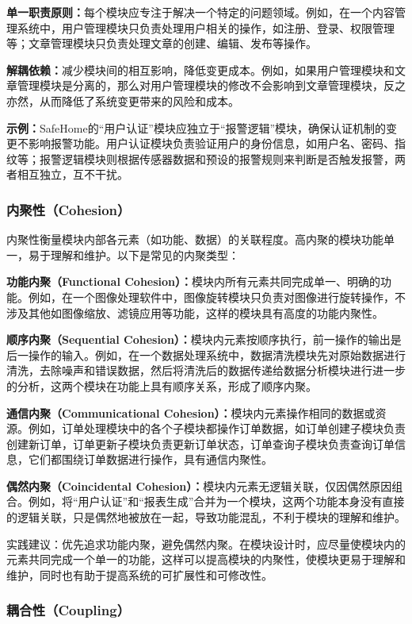 \textbf{单一职责原则：}每个模块应专注于解决一个特定的问题领域。例如，在一个内容管理系统中，用户管理模块只负责处理用户相关的操作，如注册、登录、权限管理等；文章管理模块只负责处理文章的创建、编辑、发布等操作。

\textbf{解耦依赖：}减少模块间的相互影响，降低变更成本。例如，如果用户管理模块和文章管理模块是分离的，那么对用户管理模块的修改不会影响到文章管理模块，反之亦然，从而降低了系统变更带来的风险和成本。

\textbf{示例：}SafeHome的``用户认证''模块应独立于``报警逻辑''模块，确保认证机制的变更不影响报警功能。用户认证模块负责验证用户的身份信息，如用户名、密码、指纹等；报警逻辑模块则根据传感器数据和预设的报警规则来判断是否触发报警，两者相互独立，互不干扰。

\subsubsection{内聚性（Cohesion）}

内聚性衡量模块内部各元素（如功能、数据）的关联程度。高内聚的模块功能单一，易于理解和维护。以下是常见的内聚类型：

\textbf{功能内聚（Functional Cohesion）：}模块内所有元素共同完成单一、明确的功能。例如，在一个图像处理软件中，图像旋转模块只负责对图像进行旋转操作，不涉及其他如图像缩放、滤镜应用等功能，这样的模块具有高度的功能内聚性。

\textbf{顺序内聚（Sequential Cohesion）：}模块内元素按顺序执行，前一操作的输出是后一操作的输入。例如，在一个数据处理系统中，数据清洗模块先对原始数据进行清洗，去除噪声和错误数据，然后将清洗后的数据传递给数据分析模块进行进一步的分析，这两个模块在功能上具有顺序关系，形成了顺序内聚。

\textbf{通信内聚（Communicational Cohesion）：}模块内元素操作相同的数据或资源。例如，订单处理模块中的各个子模块都操作订单数据，如订单创建子模块负责创建新订单，订单更新子模块负责更新订单状态，订单查询子模块负责查询订单信息，它们都围绕订单数据进行操作，具有通信内聚性。

\textbf{偶然内聚（Coincidental Cohesion）：}模块内元素无逻辑关联，仅因偶然原因组合。例如，将``用户认证''和``报表生成''合并为一个模块，这两个功能本身没有直接的逻辑关联，只是偶然地被放在一起，导致功能混乱，不利于模块的理解和维护。

实践建议：优先追求功能内聚，避免偶然内聚。在模块设计时，应尽量使模块内的元素共同完成一个单一的功能，这样可以提高模块的内聚性，使模块更易于理解和维护，同时也有助于提高系统的可扩展性和可修改性。

\subsubsection{耦合性（Coupling）}

